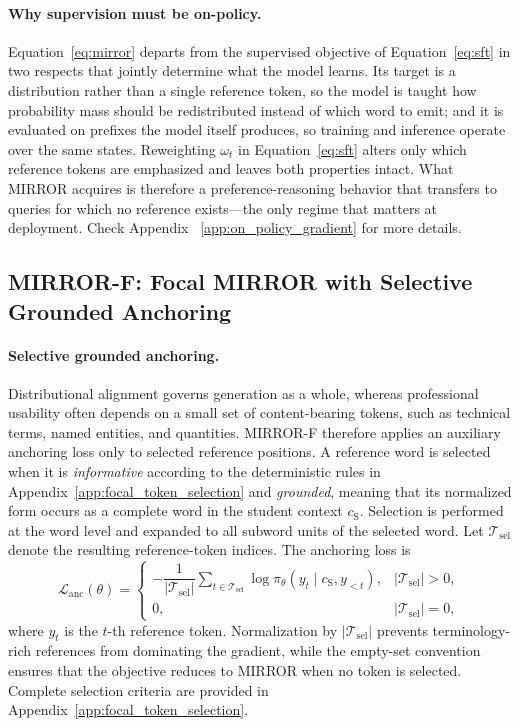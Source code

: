 \documentclass{article} %
\begin{document}
\paragraph{Why supervision must be on-policy.}
Equation~\ref{eq:mirror} departs from the supervised objective of Equation~\ref{eq:sft} in two respects that jointly determine what the model learns. Its target is a distribution rather than a single reference token, so the model is taught how probability mass should be redistributed instead of which word to emit; and it is evaluated on prefixes the model itself produces, so training and inference operate over the same states. Reweighting $\omega_t$ in Equation~\ref{eq:sft} alters only which reference tokens are emphasized and leaves both properties intact. What MIRROR acquires is therefore a preference-reasoning behavior that transfers to queries for which no reference exists---the only regime that matters at deployment. Check Appendix ~\ref{app:on_policy_gradient} for more details.

\subsection{MIRROR-F: Focal MIRROR with Selective Grounded Anchoring}
\label{sec:mirrorf}

\paragraph{Selective grounded anchoring.}
Distributional alignment governs generation as a whole, whereas professional
usability often depends on a small set of content-bearing tokens, such as
technical terms, named entities, and quantities. MIRROR-F therefore applies
an auxiliary anchoring loss only to selected reference positions. A reference
word is selected when it is \emph{informative} according to the deterministic
rules in Appendix~\ref{app:focal_token_selection} and \emph{grounded}, meaning
that its normalized form occurs as a complete word in the student context
$c_{\mathrm{S}}$. Selection is performed at the word level and expanded to
all subword units of the selected word. Let
$\mathcal{T}_{\mathrm{sel}}$ denote the resulting reference-token indices.
The anchoring loss is
\begin{equation}
\mathcal{L}_{\mathrm{anc}}(\theta)
=
\begin{cases}
-\dfrac{1}{|\mathcal{T}_{\mathrm{sel}}|}
\displaystyle\sum_{t\in\mathcal{T}_{\mathrm{sel}}}
\log \pi_\theta\!\left(y_t\mid c_{\mathrm{S}},y_{<t}\right),
&
|\mathcal{T}_{\mathrm{sel}}|>0,
\\[10pt]
0,
&
|\mathcal{T}_{\mathrm{sel}}|=0,
\end{cases}
\label{eq:anchor}
\end{equation}
where $y_t$ is the $t$-th reference token. Normalization by
$|\mathcal{T}_{\mathrm{sel}}|$ prevents terminology-rich references from
dominating the gradient, while the empty-set convention ensures that the
objective reduces to MIRROR when no token is selected. Complete selection
criteria are provided in Appendix~\ref{app:focal_token_selection}.
\end{document}
